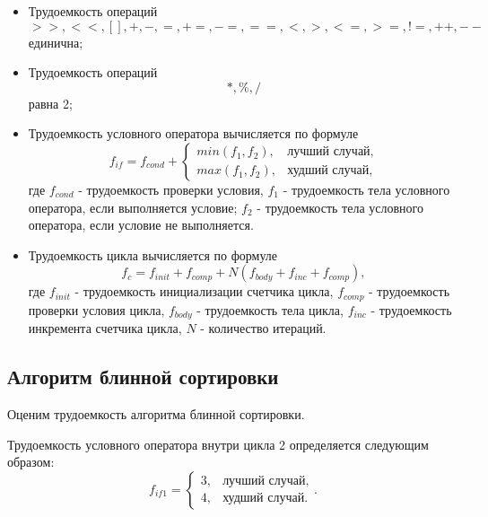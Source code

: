 \begin{itemize}
	\item Трудоемкость операций
	\begin{equation}\label{o1}
	>>, <<, [], +, -, =, +=, -=, ==, <, >, <=, >=, !=, ++, --
	\end{equation}
	единична;
	\item Трудоемкость операций
	\begin{equation}\label{o2}
		*, \%, /
	\end{equation}
	равна 2;
	\item Трудоемкость условного оператора вычисляется по формуле
	\begin{equation}\label{oif}
		f_{if} = f_{cond} + 
		\begin{cases}
			min(f_1, f_2), & \text{лучший случай}, \\
			max(f_1, f_2), & \text{худший случай},
		\end{cases}
	\end{equation}
	где $f_{cond}$ - трудоемкость проверки условия, $f_1$ - трудоемкость тела условного оператора, если выполняется условие; $f_2$ - трудоемкость тела условного оператора, если условие не выполняется.
	\item Трудоемкость цикла вычисляется по формуле
	\begin{equation}\label{oc}
	f_c = f_{init} + f_{comp} + N(f_{body} + f_{inc} + f_{comp}),
	\end{equation}
	где $f_{init}$ - трудоемкость инициализации счетчика цикла, $f_{comp}$ - трудоемкость проверки условия цикла, $f_{body}$ - трудоемкость тела цикла, $f_{inc}$ - трудоемкость инкремента счетчика цикла, $N$ - количество итераций.
\end{itemize}

\subsection{Алгоритм блинной сортировки}

Оценим трудоемкость алгоритма блинной сортировки.

Трудоемкость условного оператора внутри цикла 2 определяется следующим образом:
\begin{equation}\label{psif1}
	f_{if1} =
	\begin{cases}
		3, & \text{лучший случай}, \\
		4, & \text{худший случай}.
	\end{cases}.
\end{equation}

